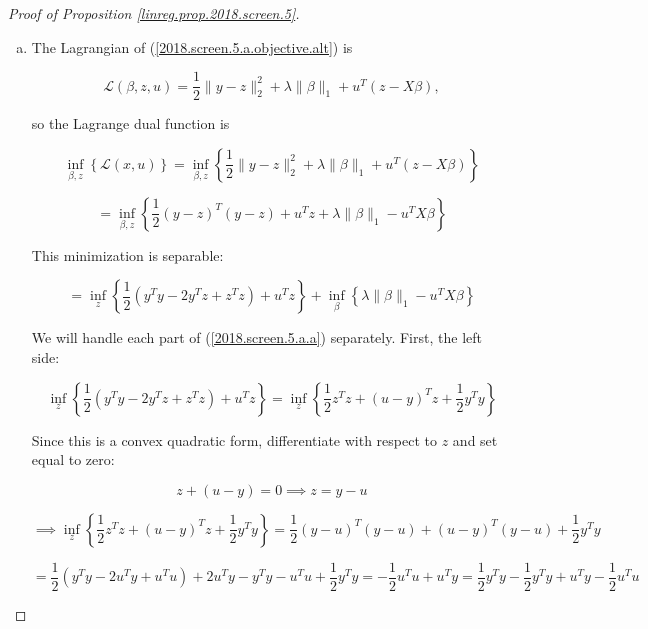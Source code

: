 \begin{proof}[Proof of Proposition \ref{linreg.prop.2018.screen.5}]

\begin{enumerate}[(a)]

\item

The Lagrangian of (\ref{2018.screen.5.a.objective.alt}) is

\[
\mathcal{L}(\beta, z, u) = \frac{1}{2} \lVert y - z \rVert_2^2 + \lambda \lVert \beta \rVert_1 + u^T(z - X \beta),
\]

so the Lagrange dual function is

\[
\inf_{\beta, z} \left\{ \mathcal{L}(x, u)\right\}  = \inf_{\beta, z} \left\{\frac{1}{2} \lVert y - z \rVert_2^2 + \lambda \lVert \beta \rVert_1 + u^T(z - X \beta)  \right\}
\]

\[
= \inf_{\beta, z} \left\{\frac{1}{2} (y-z)^T(y-z) + u^T z + \lambda \lVert \beta \rVert_1  - u^T X \beta  \right\} 
\]

This minimization is separable:

\begin{equation}\label{2018.screen.5.a.a}
= \inf_{z} \left\{\frac{1}{2} \left(y^Ty - 2 y^Tz + z^Tz \right) + u^T z \right\} + \inf_{\beta} \left\{ \lambda \lVert \beta \rVert_1  - u^T X \beta  \right\}
\end{equation}

We will handle each part of (\ref{2018.screen.5.a.a}) separately. First, the left side:

\[
 \inf_{z} \left\{\frac{1}{2} \left(y^Ty - 2 y^Tz + z^Tz \right) + u^T z \right\} = \inf_{z} \left\{\frac{1}{2}z^Tz  + (u - y)^Tz + \frac{1}{2} y^Ty   \right\} 
\]

Since this is a convex quadratic form, differentiate with respect to \(z\) and set equal to zero:

\begin{equation}\label{2018.screen.5.a.other.part.result}
z + (u - y) = 0 \implies z = y - u
\end{equation}

\[
 \implies \inf_{z} \left\{\frac{1}{2}z^Tz  + (u - y)^Tz + \frac{1}{2} y^Ty   \right\} =  \frac{1}{2}(y - u) ^T(y - u)  + (u - y)^T(y - u) + \frac{1}{2} y^Ty 
\]

\[
=  \frac{1}{2}\left(y^Ty -2 u^Ty + u^Tu \right)  + 2u^Ty - y^Ty - u^Tu + \frac{1}{2} y^Ty  = -\frac{1}{2}u^Tu   + u^Ty = \frac{1}{2} y^Ty - \frac{1}{2}y^Ty  + u^Ty - \frac{1}{2} u^Tu 
\]


\end{enumerate}
\end{proof}
